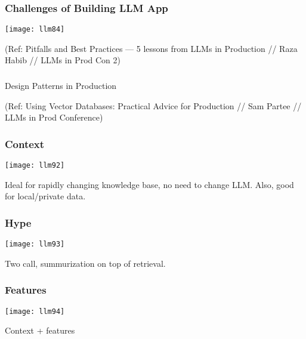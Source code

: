 \begin{frame}[fragile]\frametitle{Challenges of Building LLM App}


\begin{center}
\texttt{[image: llm84]}

\end{center}

{\tiny (Ref: Pitfalls and Best Practices — 5 lessons from LLMs in Production // Raza Habib // LLMs in Prod Con 2)}
\end{frame}


\begin{frame}[fragile]\frametitle{}
\begin{center}
{\Large Design Patterns in Production}

{\tiny (Ref: Using Vector Databases: Practical Advice for Production // Sam Partee // LLMs in Prod Conference)}

\end{center}
\end{frame}

\begin{frame}[fragile]\frametitle{Context}


\begin{center}
\texttt{[image: llm92]}

\end{center}

Ideal for rapidly changing knowledge base, no need to change LLM. Also, good for local/private data.

\end{frame}

\begin{frame}[fragile]\frametitle{Hype}


\begin{center}
\texttt{[image: llm93]}

\end{center}

Two call, summurization on top of retrieval.
\end{frame}

\begin{frame}[fragile]\frametitle{Features}


\begin{center}
\texttt{[image: llm94]}

\end{center}

Context + features
\end{frame}

